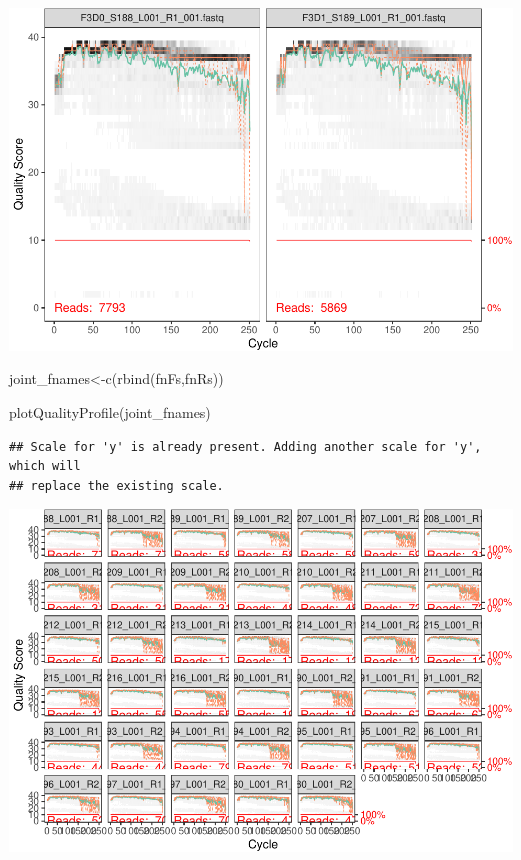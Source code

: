 \documentclass[
]{book}
\newenvironment{Shaded}{\begin{snugshade}}{\end{snugshade}}
\newcommand{\FunctionTok}[1]{\textcolor[rgb]{0.00,0.00,0.00}{#1}}
\newcommand{\NormalTok}[1]{#1}
\newcommand{\OtherTok}[1]{\textcolor[rgb]{0.56,0.35,0.01}{#1}}
\begin{document}
\includegraphics{16sworkshop_files/figure-latex/make_plots-1.pdf}

\begin{Shaded}
\begin{Highlighting}[]
\NormalTok{joint\_fnames}\OtherTok{\textless{}{-}}\FunctionTok{c}\NormalTok{(}\FunctionTok{rbind}\NormalTok{(fnFs,fnRs))}

\FunctionTok{plotQualityProfile}\NormalTok{(joint\_fnames)}
\end{Highlighting}
\end{Shaded}

\begin{verbatim}
## Scale for 'y' is already present. Adding another scale for 'y', which will
## replace the existing scale.
\end{verbatim}

\includegraphics{16sworkshop_files/figure-latex/make_plots-2.pdf}
\end{document}
